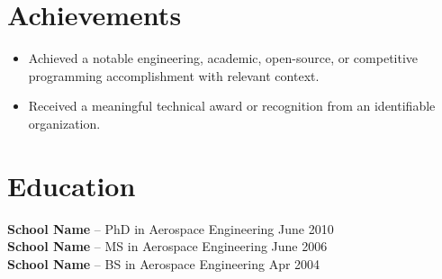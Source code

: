 \documentclass[11pt]{article}
\begin{document}
\section*{Achievements}

\begin{itemize}
  \item Achieved a notable engineering, academic, open-source, or competitive programming accomplishment with relevant context.
  \item Received a meaningful technical award or recognition from an identifiable organization.
\end{itemize}

\vspace{-18.5pt}

%
%
\section*{Education}

\textbf{School Name} -- PhD in Aerospace Engineering
\hfill June 2010 \\

\textbf{School Name} -- MS in Aerospace Engineering
\hfill June 2006 \\

\textbf{School Name} -- BS in Aerospace Engineering
\hfill Apr 2004
\end{document}
